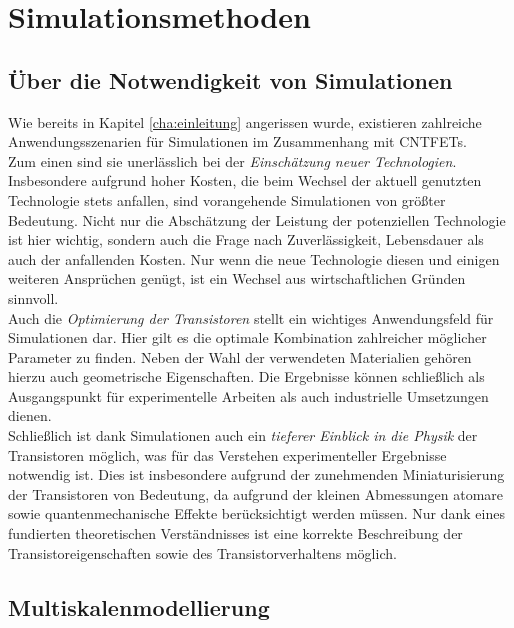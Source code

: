 \chapter{Simulationsmethoden}
\label{cha:simulationsmethoden}

\section{Über die Notwendigkeit von Simulationen}
\label{ueberdienotwendigkeitvonsimulationen}

Wie bereits in Kapitel \ref{cha:einleitung} angerissen wurde, existieren zahlreiche Anwendungsszenarien für Simulationen im Zusammenhang mit CNTFETs.\\
Zum einen sind sie unerlässlich bei der \textit{Einschätzung neuer Technologien}. Insbesondere aufgrund hoher Kosten, die beim Wechsel der aktuell genutzten Technologie stets anfallen, sind vorangehende Simulationen von größter Bedeutung. Nicht nur die Abschätzung der Leistung der potenziellen Technologie ist hier wichtig, sondern auch die Frage nach Zuverlässigkeit, Lebensdauer als auch der anfallenden Kosten. Nur wenn die neue Technologie diesen und einigen weiteren Ansprüchen genügt, ist ein Wechsel aus wirtschaftlichen Gründen sinnvoll.\\
Auch die \textit{Optimierung der Transistoren} stellt ein wichtiges Anwendungsfeld für Simulationen dar.
Hier gilt es die optimale Kombination zahlreicher möglicher Parameter zu finden.
Neben der Wahl der verwendeten Materialien gehören hierzu auch geometrische Eigenschaften.
Die Ergebnisse können schließlich als Ausgangspunkt für experimentelle Arbeiten als auch industrielle Umsetzungen dienen.\\
Schließlich ist dank Simulationen auch ein \textit{tieferer Einblick in die Physik} der Transistoren möglich, was für das Verstehen experimenteller Ergebnisse notwendig ist.
Dies ist insbesondere aufgrund der zunehmenden Miniaturisierung der Transistoren von Bedeutung, da aufgrund der kleinen Abmessungen atomare sowie quantenmechanische Effekte berücksichtigt werden müssen.
Nur dank eines fundierten theoretischen Verständnisses ist eine korrekte Beschreibung der Transistoreigenschaften sowie des Transistorverhaltens möglich.

\section{Multiskalenmodellierung}
\label{multiskalenmodellierung}

